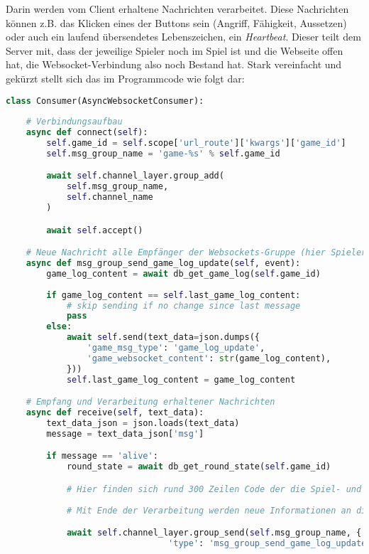 Darin werden vom Client erhaltene Nachrichten verarbeitet. Diese Nachrichten können z.B. das Klicken eines der Buttons sein (Angriff, Fähigkeit, Aussetzen) oder auch ein laufend übersendetes Lebenszeichen, ein \textit{Heartbeat}. Dieser teilt dem Server mit, dass der jeweilige Spieler noch im Spiel ist und die Webseite offen hat, die Websocket-Verbindung also noch Bestand hat. Stark vereinfacht und gekürzt stellt sich das im Programmcode wie folgt dar: 

\begin{lstlisting}[language=python]
class Consumer(AsyncWebsocketConsumer):
 
    # Verbindungsaufbau
    async def connect(self):
        self.game_id = self.scope['url_route']['kwargs']['game_id']
        self.msg_group_name = 'game-%s' % self.game_id

        await self.channel_layer.group_add(
            self.msg_group_name,
            self.channel_name
        )

        await self.accept()

    # Neue Nachricht alle Empfänger der Websockets-Gruppe (hier Spieler des Spiels) senden
    async def msg_group_send_game_log_update(self, event):
        game_log_content = await db_get_game_log(self.game_id)
        
        if game_log_content == self.last_game_log_content:
            # skip sending if no change since last message
            pass
        else:
            await self.send(text_data=json.dumps({ 
                'game_msg_type': 'game_log_update',
                'game_websocket_content': str(game_log_content),
            }))
            self.last_game_log_content = game_log_content

    # Empfang und Verarbeitung erhaltener Nachrichten
    async def receive(self, text_data):
        text_data_json = json.loads(text_data)
        message = text_data_json['msg']

        if message == 'alive':
            round_state = await db_get_round_state(self.game_id)

            # Hier finden sich rund 300 Zeilen Code der die Spiel- und Rundenlogik abbildet
                
            # Mit Ende der Verarbeitung werden neue Informationen an die Spieler des Spiels übersandt

            await self.channel_layer.group_send(self.msg_group_name, { 
                                'type': 'msg_group_send_game_log_update', })
\end{lstlisting}
    

